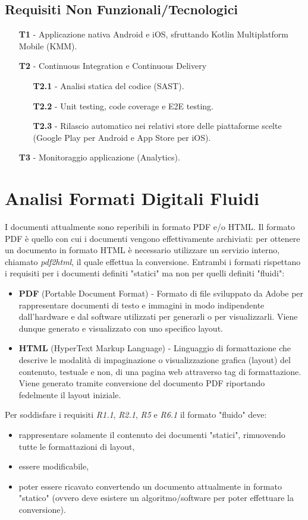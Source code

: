 \subsection{Requisiti Non Funzionali/Tecnologici}
\begin{itemize}
    \item[\textbf{T1}] - Applicazione nativa Android e iOS, sfruttando Kotlin Multiplatform Mobile (KMM).
    \item[\textbf{T2}] - Continuous Integration e Continuous Delivery
    \begin{itemize}
        \item[\textbf{T2.1}] - Analisi statica del codice (SAST).
        \item[\textbf{T2.2}] - Unit testing, code coverage e E2E testing.
        \item[\textbf{T2.3}] - Rilascio automatico nei relativi store delle piattaforme scelte (Google Play per Android e App Store per iOS).
    \end{itemize}
    \item[\textbf{T3}] - Monitoraggio applicazione (Analytics).
\end{itemize}

\section{Analisi Formati Digitali Fluidi}
I documenti attualmente sono reperibili in formato PDF e/o HTML. Il formato PDF è quello con cui i documenti vengono effettivamente archiviati: per ottenere un documento in formato HTML è necessario utilizzare un servizio interno, chiamato \textit{pdf2html}, il quale effettua la conversione. Entrambi i formati rispettano i requisiti per i documenti definiti "statici" ma non per quelli definiti "fluidi":
\begin{itemize}
    \item \textbf{PDF} (Portable Document Format) - Formato di file sviluppato da Adobe per rappresentare documenti di testo e immagini in modo indipendente dall'hardware e dal software utilizzati per generarli o per visualizzarli. Viene dunque generato e visualizzato con uno specifico layout.
    \item \textbf{HTML} (HyperText Markup Language) - Linguaggio di formattazione che descrive le modalità di impaginazione o visualizzazione grafica (layout) del contenuto, testuale e non, di una pagina web attraverso tag di formattazione. Viene generato tramite conversione del documento PDF riportando fedelmente il layout iniziale.
\end{itemize}
Per soddisfare i requisiti \textit{R1.1}, \textit{R2.1}, \textit{R5} e \textit{R6.1} il formato "fluido" deve:
\begin{itemize}
    \item rappresentare solamente il contenuto dei documenti "statici", rimuovendo tutte le formattazioni di layout,
    \item essere modificabile,
    \item poter essere ricavato convertendo un documento attualmente in formato "statico" (ovvero deve esistere un algoritmo/software per poter effettuare la conversione).
\end{itemize}


